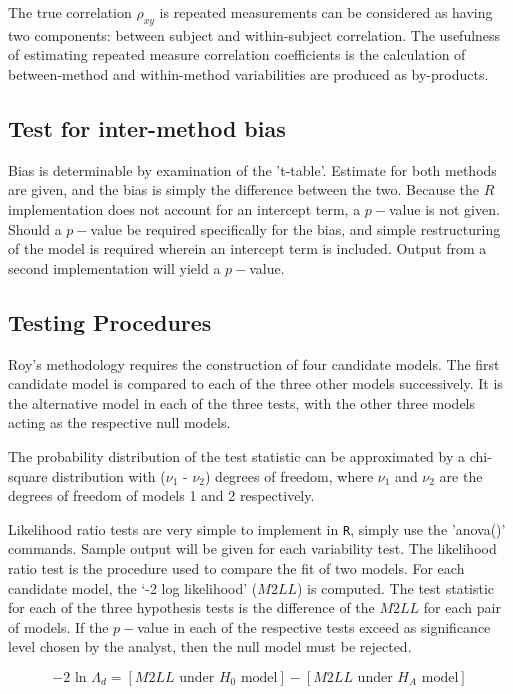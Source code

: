 \documentclass[12pt, a4paper]{report}
\begin{document}
The true correlation $\rho_{xy}$ is repeated measurements can be considered as having two components: between subject and within-subject correlation. The usefulness of estimating repeated measure correlation coefficients is the calculation of between-method and within-method variabilities are produced as by-products.



\newpage



\subsection{Test for inter-method bias}
Bias is determinable by examination of the 't-table'. Estimate for both methods are given, and the bias is simply the difference between the two. Because the $R$ implementation does not account for an intercept term, a $p-$value is not given. Should a $p-$value be required specifically for the bias, and simple restructuring of the model is required wherein an intercept term is included. Output from a second implementation will yield a $p-$value.
\newpage

\subsection{Testing Procedures}
Roy's methodology requires the construction of four candidate models. The first candidate model is compared to each of the three other models successively. It is the alternative model in each of the three tests, with the other three models acting as the respective null models.


The probability distribution of the test statistic can be approximated by a chi-square distribution with ($\nu_1$ - $\nu_2$) degrees of freedom, where $\nu_1$ and $\nu_2$ are the degrees of freedom of models 1 and 2 respectively.

Likelihood ratio tests are very simple to implement in \texttt{R}, simply use the 'anova()' commands. Sample output will be given for each variability test.
The likelihood ratio test is the procedure used to compare the fit of two models. For each candidate model, the `-2 log likelihood' ($M2LL$) is computed. The test statistic for each of the three hypothesis tests is the difference of the $M2LL$ for each pair of models. If the $p-$value in each of the respective tests exceed as significance level chosen by the analyst, then the null model must be rejected.

\begin{equation}
-2\mbox{ ln }\Lambda_{d} =  [ M2LL \mbox{ under }H_{0} \mbox{ model}] - [ M2LL \mbox{ under }H_{A} \mbox{ model}]
\end{equation}
\end{document}
